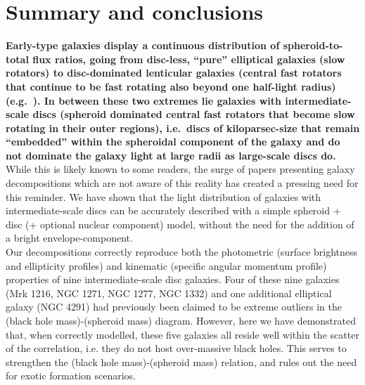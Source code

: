 \documentclass[useAMS,usenatbib,article]{mnras}
\begin{document}
\section{Summary and conclusions}
{\bf Early-type galaxies display a continuous distribution of spheroid-to-total flux ratios, 
going from disc-less, ``pure'' elliptical galaxies (slow rotators) 
to disc-dominated lenticular galaxies (central fast rotators that continue to be fast rotating also beyond one half-light radius) 
(e.g.~\citealt{cappellari2011}). 
In between these two extremes lie galaxies with intermediate-scale discs 
(spheroid dominated central fast rotators that become slow rotating in their outer regions), 
i.e.~discs of kiloparsec-size that remain ``embedded'' within the spheroidal component of the galaxy 
and do not dominate the galaxy light at large radii as large-scale discs do. }
While this is likely known to some readers, 
the surge of papers presenting galaxy decompositions which are not aware of this reality 
has created a pressing need for this reminder. 
We have shown that the light distribution of galaxies with intermediate-scale discs can be accurately described 
with a simple spheroid + disc (+ optional nuclear component) model, 
without the need for the addition of a bright envelope-component. \\
Our decompositions correctly reproduce both the photometric (surface brightness and ellipticity profiles) 
and kinematic (specific angular momentum profile) properties of nine intermediate-scale disc galaxies. 
Four of these nine galaxies (Mrk 1216, NGC 1271, NGC 1277, NGC 1332) and one additional elliptical galaxy (NGC 4291) 
had previously been claimed to be extreme outliers in the (black hole mass)-(spheroid mass) diagram. 
However, here we have demonstrated that, when correctly modelled, 
these five galaxies all reside well within the scatter of the correlation, 
i.e. they do not host over-massive black holes. 
This serves to strengthen the (black hole mass)-(spheroid mass) relation, 
and rules out the need for exotic formation scenarios. 
\end{document}
